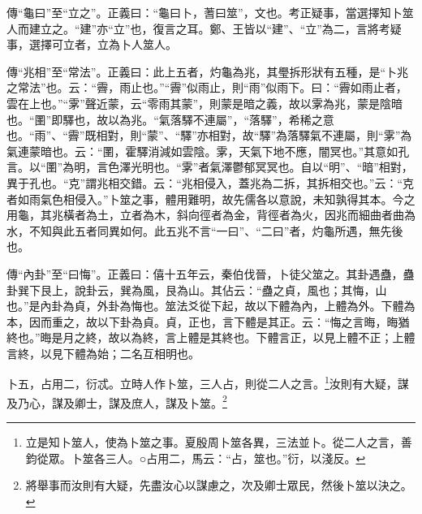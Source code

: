 {\noindent\zhuan{}\fzbyks 傳“龜曰”至“立之”。正義曰：“龜曰卜，蓍曰筮”，文也。考正疑事，當選擇知卜筮人而建立之。“建”亦“立”也，復言之耳。鄭、王皆以“建”、“立”為二，言將考疑事，選擇可立者，立為卜人筮人。 \par}

{\noindent\zhuan{}\fzbyks 傳“兆相”至“常法”。正義曰：此上五者，灼龜為兆，其璺拆形狀有五種，是“卜兆之常法”也。云：“霽，雨止也。”“霽”似雨止，則“雨”似雨下。曰：“霽如雨止者，雲在上也。”“雺”聲近蒙，云“零雨其蒙”，則蒙是暗之義，故以雺為兆，蒙是陰暗也。“圛”即驛也，故以為兆。“氣落驛不連屬”，“落驛”，希稀之意也。“雨”、“霽”既相對，則“蒙”、“驛”亦相對，故“驛”為落驛氣不連屬，則“雺”為氣連蒙暗也。云：“圛，霍驛消減如雲陰。雺，天氣下地不應，闇冥也。”其意如孔言。以“圛”為明，言色澤光明也。“雺”者氣澤鬱郁冥冥也。自以“明”、“暗”相對，異于孔也。“克”謂兆相交錯。云：“兆相侵入，蓋兆為二拆，其拆相交也。”云：“克者如雨氣色相侵入。”卜筮之事，體用難明，故先儒各以意說，未知孰得其本。今之用龜，其兆橫者為土，立者為木，斜向徑者為金，背徑者為火，因兆而細曲者曲為水，不知與此五者同異如何。此五兆不言“一曰”、“二曰”者，灼龜所遇，無先後也。 \par}

{\noindent\zhuan{}\fzbyks 傳“內卦”至“曰悔”。正義曰：僖十五年云，秦伯伐晉，卜徒父筮之。其卦遇蠱，蠱卦巽下艮上，說卦云，巽為風，艮為山。其佔云：“蠱之貞，風也；其悔，山也。”是內卦為貞，外卦為悔也。筮法爻從下起，故以下體為內，上體為外。下體為本，因而重之，故以下卦為貞。貞，正也，言下體是其正。云：“悔之言晦，晦猶終也。”晦是月之終，故以為終，言上體是其終也。下體言正，以見上體不正；上體言終，以見下體為始；二名互相明也。 \par}

卜五，占用二，衍忒。立時人作卜筮，三人占，則從二人之言。\footnote{立是知卜筮人，使為卜筮之事。夏殷周卜筮各異，三法並卜。從二人之言，善鈞從眾。卜筮各三人。○占用二，馬云：“占，筮也。”衍，以淺反。}汝則有大疑，謀及乃心，謀及卿士，謀及庶人，謀及卜筮。\footnote{將舉事而汝則有大疑，先盡汝心以謀慮之，次及卿士眾民，然後卜筮以決之。}


